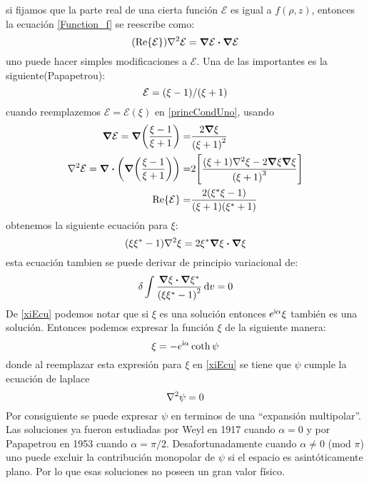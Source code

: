 \documentclass[../Main.tex]{subfiles}
\begin{document}
%
si fijamos que la parte real de una cierta función $\mathcal{E}$ es igual a $f(\rho,z)$, entonces la ecuación \eqref{Function_f} se reescribe como:
%
\begin{equation}
    \qty(\Re{\mathcal{E}})\laplacian{\mathcal{E}}=\grad{\mathcal{E}}\vdot\grad{\mathcal{E}}
    \label{princCondUno}
\end{equation}
%
uno puede hacer simples modificaciones a $\mathcal{E}$. Una de las importantes es la siguiente(Papapetrou):
%
\begin{equation}
    \mathcal{E}=\qty(\xi-1)/\qty(\xi+1)
    \label{Eecu}
\end{equation}
%
cuando reemplazemos $\mathcal{E}=\mathcal{E}(\xi)$ en \eqref{princCondUno}, usando
%
\begin{eqnarray}
    \grad{\mathcal{E}}=\grad(\dfrac{\xi-1}{\xi+1})= & \dfrac{2\grad{\xi}}{\qty(\xi+1)^{2}} \\
    \laplacian{\mathcal{E}}= \div(\grad(\dfrac{\xi-1}{\xi+1}))= & 2\qty[\dfrac{\qty(\xi+1)\laplacian{\xi}-2\grad{\xi}\grad{\xi}}{\qty(\xi+1)^{3}}] \\
    \Re{\mathcal{E}}= & \dfrac{2\qty(\xi^{*}\xi-1)}{\qty(\xi+1)\qty(\xi^{*}+1)}
\end{eqnarray}
%
obtenemos la siguiente ecuación para $\xi$:
%
\begin{equation}
    \qty(\xi\xi^{*}-1)\laplacian{\xi}=2\xi^{*}\grad{\xi}\vdot\grad{\xi}
    \label{xiEcu}
\end{equation}
%
esta ecuación tambien se puede derivar de principio variacional de:
%
\begin{equation}
    \delta\int\dfrac{\grad{\xi}\vdot\grad{\xi}^{*}}{\qty(\xi\xi^{*}-1)^{2}}\dd{v}=0
\end{equation}
%
De \eqref{xiEcu} podemos notar que si $\xi$ es una solución entonces $e^{\mathsf{i}\alpha}\xi$ también es una solución. Entonces podemos expresar la función $\xi$ de la siguiente manera:
%
\begin{equation}
    \xi=-e^{\mathsf{i}\alpha}\coth{\psi}
    \label{psiEcu}
\end{equation}
%
donde al reemplazar esta expresión para $\xi$ en \eqref{xiEcu} se tiene que $\psi$ cumple la ecuación de laplace
%
\begin{equation}
    \laplacian{\psi}=0
    \label{psilaplace}
\end{equation}
%
Por consiguiente se puede expresar $\psi$ en terminos de una ``expansión multipolar''. Las soluciones ya fueron estudiadas por Weyl en 1917 cuando $\alpha=0$ y por Papapetrou en 1953 cuando $\alpha=\pi/2$. Desafortunadamente cuando $\alpha \neq 0$ (mod $\pi$) uno puede excluir la contribución monopolar de $\psi$ si el espacio es asintóticamente plano. Por lo que esas soluciones no poseen un gran valor físico.
\end{document}
